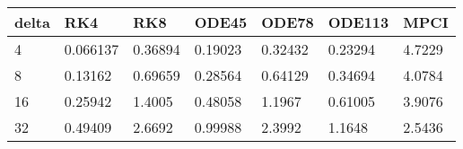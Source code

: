 \begin{tabular}{lllllll}
delta & RK4 & RK8 & ODE45 & ODE78 & ODE113 & MPCI \\ 
\hline 
4 & 0.066137 & 0.36894 & 0.19023 & 0.32432 & 0.23294 & 4.7229 \\ 
8 & 0.13162 & 0.69659 & 0.28564 & 0.64129 & 0.34694 & 4.0784 \\ 
16 & 0.25942 & 1.4005 & 0.48058 & 1.1967 & 0.61005 & 3.9076 \\ 
32 & 0.49409 & 2.6692 & 0.99988 & 2.3992 & 1.1648 & 2.5436 \\ 
\hline 
\end{tabular}